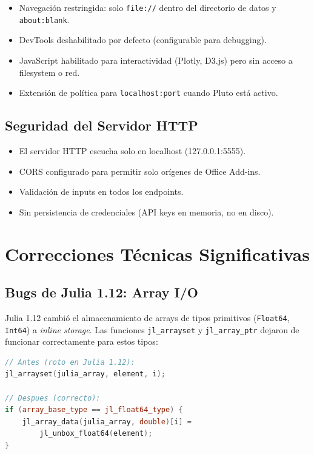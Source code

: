 \documentclass[12pt, a4paper]{report}
\begin{document}
\begin{itemize}
    \item Navegación restringida: solo \texttt{file://} dentro del directorio de datos y \texttt{about:blank}.
    \item DevTools deshabilitado por defecto (configurable para debugging).
    \item JavaScript habilitado para interactividad (Plotly, D3.js) pero sin acceso a filesystem o red.
    \item Extensión de política para \texttt{localhost:port} cuando Pluto está activo.
\end{itemize}

\section{Seguridad del Servidor HTTP}

\begin{itemize}
    \item El servidor HTTP escucha solo en localhost (127.0.0.1:5555).
    \item CORS configurado para permitir solo orígenes de Office Add-ins.
    \item Validación de inputs en todos los endpoints.
    \item Sin persistencia de credenciales (API keys en memoria, no en disco).
\end{itemize}

\chapter{Correcciones Técnicas Significativas}

\section{Bugs de Julia 1.12: Array I/O}

Julia 1.12 cambió el almacenamiento de arrays de tipos primitivos (\texttt{Float64}, \texttt{Int64}) a \textit{inline storage}. Las funciones \texttt{jl\_arrayset} y \texttt{jl\_array\_ptr} dejaron de funcionar correctamente para estos tipos:

\begin{lstlisting}[language=C++, caption={Fix para arrays primitivos en Julia 1.12}]
// Antes (roto en Julia 1.12):
jl_arrayset(julia_array, element, i);

// Despues (correcto):
if (array_base_type == jl_float64_type) {
    jl_array_data(julia_array, double)[i] = 
        jl_unbox_float64(element);
}
\end{lstlisting}
\end{document}
